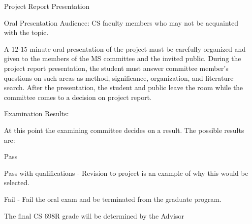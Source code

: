 \documentclass[ms,electronic,oneside,twosidetoc,letterpaper,chaptercenter,parttop]{byumsphd}
\begin{document}
Project Report Presentation 

Oral Presentation Audience: CS faculty members who may not be acquainted with the topic.

A 12-15 minute oral presentation of the project must be carefully organized and given to the members of the MS committee and the invited public. During the project report presentation, the student must answer committee member's questions on such areas as method, significance, organization, and literature search. After the presentation, the student and public leave the room while the committee comes to a decision on project report. 
 

Examination Results:

At this point the examining committee decides on a result. The possible results are:

Pass

Pass with qualifications - Revision to project is an example of why this would be selected.

Fail - Fail the oral exam and be terminated from the graduate program.

The final CS 698R grade will be determined by the Advisor



\end{document}
